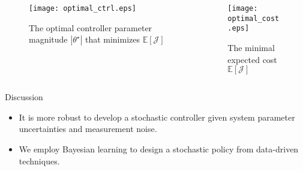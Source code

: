 \begin{frame}{}

  \begin{columns}

    \begin{column}[t]{0.48\linewidth}
      \begin{figure}
        \texttt{[image: optimal\_ctrl.eps]}
        \caption{The optimal controller parameter magnitude $|\theta^\star|$ that minimizes $\mathbb{E}[\mathcal{J}]$}
      \end{figure}
    \end{column}

    \begin{column}[t]{0.46\linewidth}
      \begin{figure}
        \texttt{[image: optimal\_cost.eps]}
        \caption{The minimal expected cost $\mathbb{E}[\mathcal{J}]$}
      \end{figure}
    \end{column}

  \end{columns}

\end{frame}

\begin{frame}{Discussion}
  \begin{itemize}
    \item It is more robust to develop a stochastic controller given system
    parameter uncertainties and measurement noise.
    \item We employ Bayesian learning to design a stochastic policy from
    data-driven techniques.
  \end{itemize}
\end{frame}

